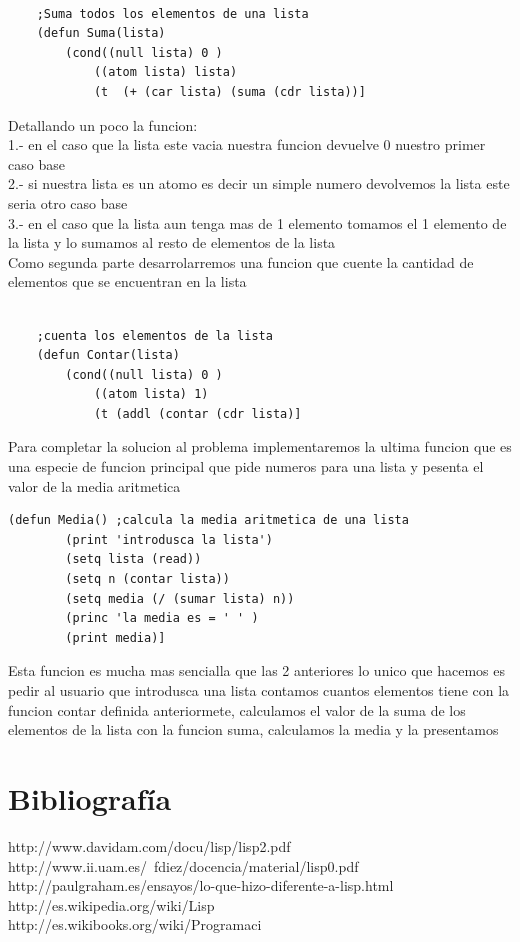 \documentclass[11pt]{article} %
\begin{document}
\begin{lstlisting}[frame=single]
	
	;Suma todos los elementos de una lista
	(defun Suma(lista)
		(cond((null lista) 0 )
			((atom lista) lista)
			(t  (+ (car lista) (suma (cdr lista))] 
\end{lstlisting}

Detallando un poco la funcion:\\
1.- en el caso que la lista este vacia nuestra funcion devuelve 0 nuestro primer caso base\\
2.- si nuestra lista es un atomo es decir un simple numero devolvemos la lista este seria otro caso base\\
3.- en el caso que la lista aun tenga mas de 1 elemento tomamos el 1 elemento de la lista y lo sumamos al resto de elementos de la lista\\

Como segunda parte desarrolarremos una funcion que cuente la cantidad de elementos que se encuentran en la lista

\lstset{language=LISP}          %

\begin{lstlisting}[frame=single]
	
	;cuenta los elementos de la lista
	(defun Contar(lista)
		(cond((null lista) 0 )
			((atom lista) 1)
			(t (addl (contar (cdr lista)] 
\end{lstlisting}

Para completar la solucion al problema implementaremos la ultima funcion que es una especie de funcion principal que pide numeros para una lista y pesenta el valor de la media aritmetica

\lstset{language=LISP}          %

\begin{lstlisting}[frame=single]
	(defun Media() ;calcula la media aritmetica de una lista
		(print 'introdusca la lista')
		(setq lista (read))
		(setq n (contar lista))
		(setq media (/ (sumar lista) n))
		(princ 'la media es = ' ' )
		(print media)]
\end{lstlisting}

Esta funcion es mucha mas sencialla que las 2 anteriores lo unico que hacemos es pedir al usuario que introdusca una lista contamos cuantos elementos tiene con la funcion contar definida anteriormete, calculamos el valor de la suma de los elementos de la lista con la funcion suma, calculamos la media y la presentamos

\section{Bibliografía}


http://www.davidam.com/docu/lisp/lisp2.pdf
\\ http://www.ii.uam.es/~fdiez/docencia/material/lisp0.pdf
\\ http://paulgraham.es/ensayos/lo-que-hizo-diferente-a-lisp.html
\\ http://es.wikipedia.org/wiki/Lisp
\\ http://es.wikibooks.org/wiki/Programaci%
  
\end{document}
